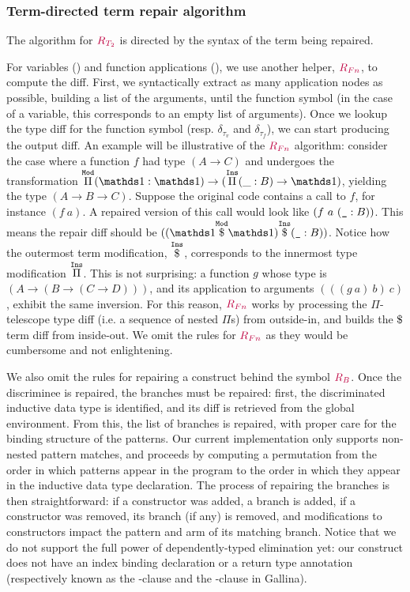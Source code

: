 \subsubsection*{Term-directed term repair algorithm}

The algorithm for $\textcolor{purple}{R_{T_2}}$ is directed by the syntax of the term
being repaired.

For variables () and function applications
(), we use another helper, $\textcolor{purple}{R_{Fn}}$, to compute the
diff.  First, we syntactically extract as many application nodes as possible,
building a list of the arguments, until the function symbol (in the case of a
variable, this corresponds to an empty list of arguments).  Once we lookup the
type diff for the function symbol (resp. $\delta_{\tau_v}$ and
$\delta_{\tau_f}$), we can start producing the output diff.  An example will be
illustrative of the $\textcolor{purple}{R_{Fn}}$ algorithm: consider the case where a
function $f$ had type $(A \rightarrow C)$ and undergoes the transformation
$\MathModPi{\MathSame}{\MathSame}{(\MathInsPi{B}{\_}{\MathSame})}$, yielding the
type $(A \rightarrow B \rightarrow C)$.  Suppose the original code contains a
call to $f$, for instance $(f\ a)$.  A repaired version of this call would look
like $(f\ a\ (\texttt{\_} : B))$.  This means the repair diff should be
$(\MathInsApp{(\MathModApp{\MathSame}{\MathSame})}{(\MathAnnot{\MathHole}{B})})$.
Notice how the outermost term modification, $\overset{\mathtt{Ins}}{\$}$, corresponds to the
innermost type modification $\overset{\mathtt{Ins}}{\Pi}$.  This is not surprising: a function
$g$ whose type is $(A \rightarrow (B \rightarrow (C \rightarrow D)))$, and its
application to arguments $(((g\ a)\ b)\ c)$, exhibit the same inversion.  For
this reason, $\textcolor{purple}{R_{Fn}}$ works by processing the $\Pi$-telescope type diff
(i.e. a sequence of nested $\Pi$s) from outside-in, and builds the $\App$ term
diff from inside-out.  We omit the rules for $\textcolor{purple}{R_{Fn}}$ as they would be
cumbersome and not enlightening.

We also omit the rules for repairing a  construct behind the
symbol $\textcolor{purple}{R_{B}}$.  Once the discriminee is repaired, the branches must
be repaired: first, the discriminated inductive data type is identified, and its
diff is retrieved from the global environment.  From this, the list of branches
is repaired, with proper care for the binding structure of the patterns.  Our
current implementation only supports non-nested pattern matches, and proceeds by
computing a permutation from the order in which patterns appear in the program
to the order in which they appear in the inductive data type declaration.  The
process of repairing the branches is then straightforward: if a constructor was
added, a branch is added, if a constructor was removed, its branch (if any) is
removed, and modifications to constructors impact the pattern and arm of its
matching branch.  Notice that we do not support the full power of
dependently-typed elimination yet: our  construct does not have
an index binding declaration or a return type annotation (respectively known as
the -clause and the -clause in Gallina).

